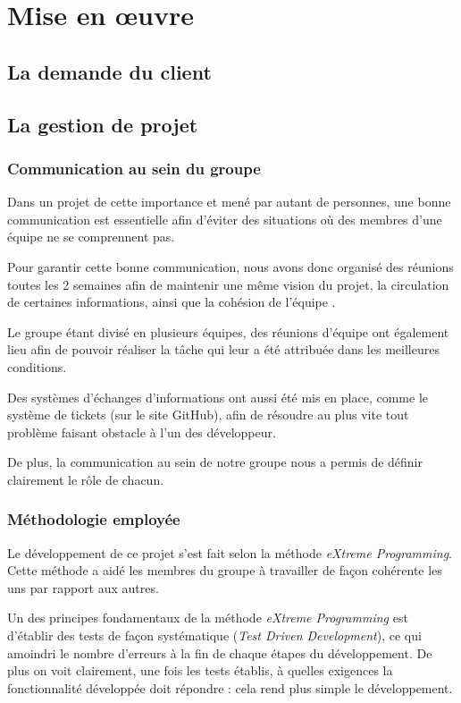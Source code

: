 \chapter{Mise en œuvre}
\section{La demande du client}

 \section{La gestion de projet}

  \subsection{Communication au sein du groupe}

    Dans un projet de cette importance et mené par autant de personnes, une
    bonne communication est essentielle afin d'éviter des situations où des
    membres d'une équipe ne se comprennent pas.

    Pour garantir cette bonne communication, nous avons donc organisé des
    réunions toutes les 2 semaines afin de maintenir une même vision du projet,
    la circulation de certaines informations, ainsi que la cohésion de l'équipe
    .

    Le groupe étant divisé en plusieurs équipes, des réunions d'équipe ont
    également lieu afin de pouvoir réaliser la tâche qui leur a été attribuée
    dans les meilleures conditions.

    Des systèmes d'échanges d'informations ont aussi été mis en place, comme le
    système de tickets (sur le site GitHub), afin de résoudre au plus vite tout
    problème faisant obstacle à l'un des développeur.

    De plus, la communication au sein de notre groupe nous a permis de définir
    clairement le rôle de chacun.


  \subsection{Méthodologie employée}

    Le développement de ce projet s'est fait selon la méthode \emph{eXtreme
    Programming}. Cette méthode a aidé les membres du groupe à travailler de
    façon cohérente les uns par rapport aux autres.

    Un des principes fondamentaux de la méthode \emph{eXtreme Programming} est
    d'établir des tests de façon systématique (\emph{Test Driven Development}),
    ce qui amoindri le nombre d'erreurs à la fin de chaque étapes du
    développement. De plus on voit clairement, une fois les tests établis, à
    quelles exigences la fonctionnalité développée doit répondre : cela rend
    plus simple le développement.


